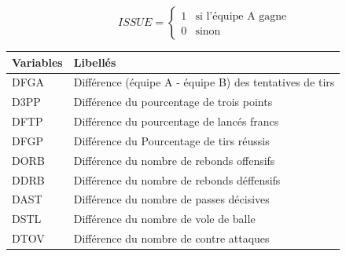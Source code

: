\documentclass[10pt]{beamer}
\begin{document}
\begin{frame}{}
\begin{columns}
\begin{column}{1\textwidth} 	
	\vspace*{-0.5cm}
	
		\begin{center}
		$$
		ISSUE = \left\{                 
		\begin{array}{ll}
		1 & \mbox{si l'équipe A gagne}  \\
		0 & \mbox{sinon}
		\end{array}
		\right.
		$$
	\end{center} 
	
		
		\begin{center} 
			\renewcommand{\arraystretch}{1.2}
			\footnotesize
			\begin{tabular}{||l||l||}
				\hline \hline
		\textbf{Variables}	&\textbf{Libellés}  \\
				\hline \hline
	DFGA & Différence (équipe A - équipe B) des tentatives de tirs \\ 
        D3PP &  Différence du pourcentage de trois points \\ 
        DFTP &  Différence du pourcentage de lancés francs \\ 
        DFGP & Différence du Pourcentage de tirs réussis \\ 
        DORB & Différence du nombre de rebonds offensifs \\ 
        DDRB & Différence du nombre de rebonds déffensifs \\ 
        DAST & Différence du nombre de passes décisives \\
        DSTL & Différence du nombre de vole de balle\\
        DTOV & Différence du nombre de contre attaques\\

				\hline \hline
				
			\end{tabular} 
		\end{center}
\color{black}
\end{column}
\end{columns}
\end{frame}
\end{document}
